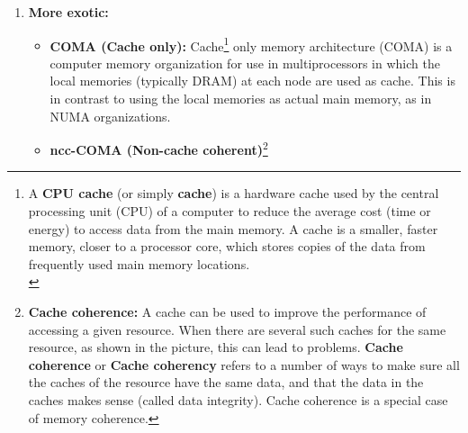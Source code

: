 \documentclass[12pt, a4paper]{report}
\begin{document}
\begin{enumerate}[label=\bfseries (\Alph*)]
    \item {\bfseries More exotic:}
            \begin{itemize}
                \item {\bfseries COMA (Cache only):} Cache\footnote[2]{A {\bfseries CPU cache} (or simply {\bfseries cache}) is a 
                        hardware cache used by the central processing unit (CPU) of a computer to reduce the average cost (time or 
                        energy) to access data from the main memory. A cache is a smaller, faster memory, closer to a processor core,
                        which stores copies of the data from frequently used main memory locations.\\[-0.7em]} only memory architecture 
                        (COMA) is a computer memory organization for use in multiprocessors in which the local memories (typically DRAM) at 
                        each node are used as cache. This is in contrast to using the local memories as actual main memory, as in
                        NUMA organizations.
                \item {\bfseries ncc-COMA (Non-cache coherent)}\footnote[3]{{\bfseries Cache coherence:} A cache can be used
                        to improve the performance of accessing a given resource. When there are several such caches for the
                        same resource, as shown in the picture, this can lead to problems. {\bfseries Cache coherence} or 
                        {\bfseries Cache coherency} refers to a number of ways to make sure all the caches of the resource 
                        have the same data, and that the data in the caches makes sense (called data integrity). Cache coherence
                        is a special case of memory coherence.}  
            \end{itemize}
\end{enumerate}
\end{document}
